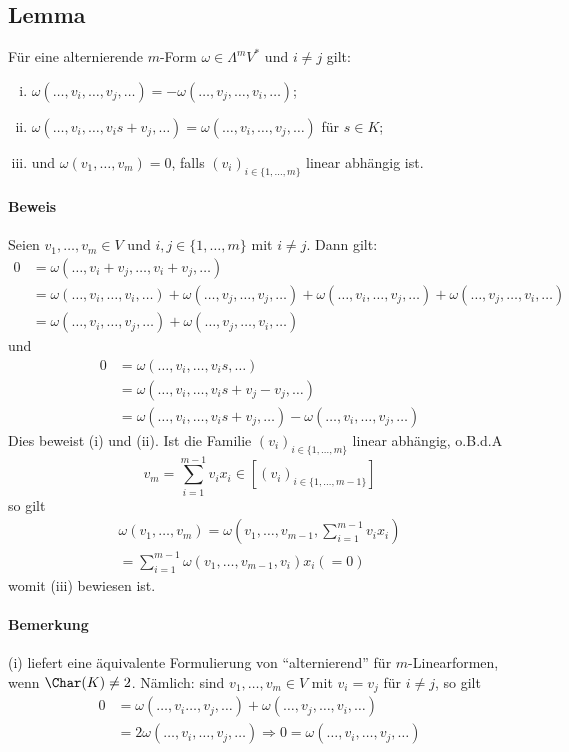 \subsection{Lemma}
	\begin{Lemma}
		Für eine alternierende $ m $-Form $ \omega \in \Lambda^mV^* $ und $ i\neq j $ gilt:
		\begin{enumerate}[(i)]
			\item $ \omega(\dots,v_i,\dots,v_j,\dots) = -\omega (\dots,v_j,\dots,v_i,\dots)$;
			\item $ \omega(\dots,v_i,\dots,v_is+v_j,\dots) = \omega(\dots,v_i,\dots,v_j,\dots) $ für $ s\in K $;
			\item und $ \omega(v_1,\dots,v_m)=0 $, falls $ (v_i)_{i\in \{1,\dots,m\}} $ linear abhängig ist.
		\end{enumerate}
\paragraph{Beweis}
	Seien $ v_1,\dots,v_m\in V $ und $ i,j\in \{1,\dots,m\} $ mit $ i\neq j $. Dann gilt:
		\begin{align*}
			0 &= \omega(\dots,v_i+v_j,\dots,v_i+v_j,\dots)\\
			&= \omega(\dots,v_i,\dots,v_i,\dots)+\omega(\dots,v_j,\dots,v_j,\dots)+\omega(\dots,v_i,\dots,v_j,\dots)+\omega(\dots,v_j,\dots,v_i,\dots)\\
			&= \omega(\dots,v_i,\dots,v_j,\dots)+\omega(\dots,v_j,\dots,v_i,\dots)
		\end{align*}
	und
		\begin{align*}
		0&=\omega(\dots,v_i,\dots,v_is,\dots)\\
		&= \omega(\dots,v_i,\dots,v_is+v_j-v_j,\dots)\\
		&= \omega(\dots,v_i,\dots,v_is+v_j,\dots)-\omega(\dots,v_i,\dots,v_j,\dots)
		\end{align*}
	Dies beweist (i) und (ii). Ist die Familie $ (v_i)_{i\in \{1,\dots,m\}} $ linear abhängig, o.B.d.A
		\[ v_m = \sum_{i=1}^{m-1}v_ix_i \in [(v_i)_{i\in \{1,\dots,m-1\}}] \]
	so gilt
		\begin{gather*}
		\omega(v_1,\dots,v_m)=\omega(v_1,\dots,v_{m-1},\sum_{i=1}^{m-1}v_ix_i)\\
		= \sum_{i=1}^{m-1}\omega(v_1,\dots,v_{m-1},v_i)x_i (=0)
		\end{gather*}
	womit (iii) bewiesen ist.
	\end{Lemma}
\paragraph{Bemerkung}
	(i) liefert eine äquivalente Formulierung von "`alternierend"' für $ m $-Linearformen, wenn $ \Char (K)\neq 2 $.
	Nämlich: sind $ v_1,\dots,v_m\in V $ mit $ v_i=v_j $ für $ i\neq j $, so gilt
		\begin{align*}
		0 &= \omega(\dots,v_i\dots,v_j,\dots)+\omega(\dots,v_j,\dots,v_i,\dots)\\
		&= 2\omega(\dots,v_i,\dots,v_j,\dots) \Rightarrow 0 = \omega(\dots,v_i,\dots,v_j,\dots)
		\end{align*}
